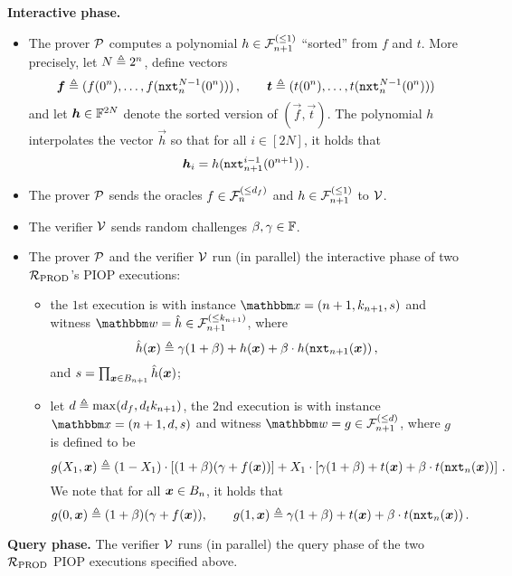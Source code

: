 \textbf{Interactive phase.} 
\begin{itemize}
    \item The prover $\mathcal{P}$ computes a polynomial $h \in {\mathcal{F}}_{n+1}^{(\le{1})}$ ``sorted'' from $f$ and $t$.
        More precisely, let $N \mathrel{\triangleq} 2^n$, define vectors
        \[
            \boldsymbol{f} \mathrel{\triangleq} (f(0^n), \dots, f(\mathtt{nxt}_{n}^{N-1}(0^n)))\,, \qquad 
            \boldsymbol{t} \mathrel{\triangleq} (t(0^n), \dots, t(\mathtt{nxt}_{n}^{N-1}(0^n))) 
        \]
        and let $\boldsymbol{h} \in \mathbb{F}^{2N}$ denote the sorted version of $(\vec{f}, \vec{t})$.
        The polynomial $h$ interpolates the vector $\vec{h}$ so that for all $i \in [2N]$,
        it holds that
        \[
            \boldsymbol{h}_i = h(\mathtt{nxt}_{n+1}^{i-1}(0^{n+1})) \,.
        \]
        
    \item The prover $\mathcal{P}$ sends the oracles $f \in {\mathcal{F}}_{n}^{(\le{d_f})}$ and $h \in {\mathcal{F}}_{n+1}^{(\le{1})}$ to $\mathcal{V}$.
    \item The verifier $\mathcal{V}$ sends random challenges $\beta, \gamma \in \mathbb{F}$.
    
    \item The prover $\mathcal{P}$ and the verifier $\mathcal{V}$ run (in parallel) the interactive phase 
    of two ${\mathcal{R}}_{\text{PROD}}$'s PIOP executions:
        \begin{itemize}
            \item the $1$st execution is with instance $\instR = (n+1, \sps{n+1}, s)$ and
                witness $\witR = \hat{h} \in \bdp{n+1}{\sps{n+1}}$, where 
                \[
                    \hat{h}(\boldsymbol{x}) \mathrel{\triangleq} \gamma(1+\beta) + h(\boldsymbol{x}) + \beta \cdot h(\mathtt{nxt}_{n+1}(\boldsymbol{x})) \,,
                \] and $s = \prod_{\boldsymbol{x}\in B_{n+1}} \hat{h}(\boldsymbol{x})$;
                
            \item let $d \mathrel{\triangleq} \max(d_f, d_t k_{n+1})$, the $2$nd execution is with instance 
                $\instR = (n+1, d, s)$ and 
                witness $\witR = g \in \bdp{n+1}{d}$, where $g$ is defined to be 
                \[
                    g(X_1, \boldsymbol{x}) \mathrel{\triangleq} (1-X_1) \cdot \left[(1+\beta)(\gamma + f(\boldsymbol{x}))\right]
                                    + X_1 \cdot \left[\gamma(1+\beta) + t(\boldsymbol{x}) + \beta \cdot t(\mathtt{nxt}_{n}(\boldsymbol{x}))\right]\,.
                \]
                We note that for all $\boldsymbol{x} \in B_{n}$, it holds that
                \[
                    g(0, \boldsymbol{x}) \mathrel{\triangleq} (1+\beta)(\gamma + f(\boldsymbol{x})), \qquad 
                    g(1, \boldsymbol{x}) \mathrel{\triangleq} \gamma(1+\beta) + t(\boldsymbol{x}) + \beta \cdot t(\mathtt{nxt}_{n}(\boldsymbol{x})) \,.
                \]
        \end{itemize}
\end{itemize}

\textbf{Query phase.}
The verifier $\mathcal{V}$ runs (in parallel) the query phase of the two ${\mathcal{R}}_{\text{PROD}}$ PIOP 
executions specified above.

